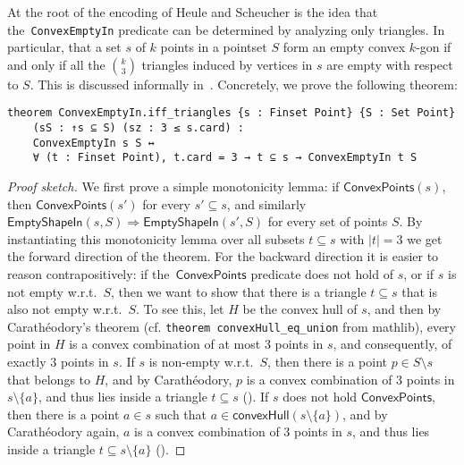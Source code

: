 At the root  of the encoding of Heule and Scheucher is the idea that the~\lstinline|ConvexEmptyIn| predicate can be determined by analyzing only triangles. In particular, that a set $s$ of $k$ points in a pointset $S$ form an empty convex $k$-gon if and only if all the ${k \choose 3}$ triangles induced by vertices in $s$ are empty with respect to $S$. This is discussed informally in~\cite[Section 3, Eq.~4]{emptyHexagonNumber}.
Concretely, we prove the following theorem:
\begin{lstlisting}
theorem ConvexEmptyIn.iff_triangles {s : Finset Point} {S : Set Point}
    (sS : ↑s ⊆ S) (sz : 3 ≤ s.card) :
    ConvexEmptyIn s S ↔
    ∀ (t : Finset Point), t.card = 3 → t ⊆ s → ConvexEmptyIn t S
\end{lstlisting}

\begin{proof}[Proof sketch]
    We first prove a simple monotonicity lemma: if $\textsf{ConvexPoints}(s)$, then $\textsf{ConvexPoints}(s')$ for every $s' \subseteq s$, and similarly $\textsf{EmptyShapeIn}(s, S) \Rightarrow \textsf{EmptyShapeIn}(s', S)$ for every set of points $S$.
    By instantiating this monotonicity lemma over all subsets $t \subseteq s$ with $|t| = 3$ we get the forward direction of the theorem.
    For the backward direction it is easier to reason contrapositively: if the~$\textsf{ConvexPoints}$ predicate does not hold of $s$, or if $s$ is not empty w.r.t.~$S$, then we want to show that there is a triangle $t \subseteq s$ that is also not empty w.r.t.~$S$. To see this, let $H$ be the convex hull of $s$, and then by Carath\'eodory's theorem (cf. \lstinline|theorem convexHull_eq_union| from \textsf{mathlib}), every point in $H$ is a convex combination of at most $3$ points in $s$, and consequently, of exactly $3$ points in $s$.
    If $s$ is non-empty w.r.t.~$S$, then there is a point $p \in S \setminus s$ that belongs to $H$, and by Carath\'eodory, $p$ is a convex combination of $3$ points in $s \setminus \{a\}$, and thus lies inside a triangle $t \subseteq s$ (). If $s$ does not hold $\textsf{ConvexPoints}$, then there is a point $a \in s$ such that $a \in \textsf{convexHull}(s \setminus \{a\})$, and by Carath\'eodory again, $a$ is a convex combination of $3$ points in $s$, and thus lies inside a triangle $t \subseteq s \setminus \{a\}$ ().

\end{proof}
